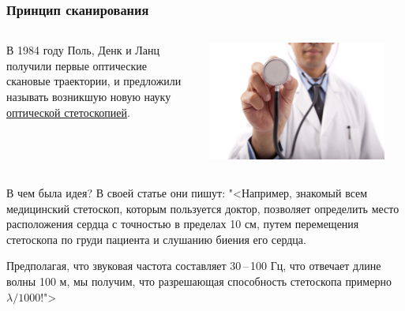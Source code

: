 \documentclass[9pt, compress, xcolor=table]{beamer}
\begin{document}
\begin{frame}[fragile]
\frametitle{Принцип сканирования}

\begin{columns}[c]
\column{6cm}
\begin{center}
В 1984 году Поль, Денк и Ланц получили первые оптические скановые траектории, и
предложили называть возникшую новую науку \underline{оптической стетоскопией}.
\end{center}
 
 \column{6cm}
\begin{center}
\includegraphics[width=0.9\textwidth]{doctor}
\end{center}
\end{columns}



В чем была идея? В своей статье они пишут: "<Например, знакомый всем медицинский стетоскоп, которым
пользуется доктор, позволяет определить место расположения сердца с точностью в пределах 10 см,
путем перемещения стетоскопа по груди пациента и слушанию биения его сердца. 

Предполагая, что звуковая частота составляет 30\,--\,100 Гц, что отвечает длине волны 100 м, мы получим, что разрешающая способность стетоскопа примерно $\lambda/1000$!">

\end{frame}
\end{document}
